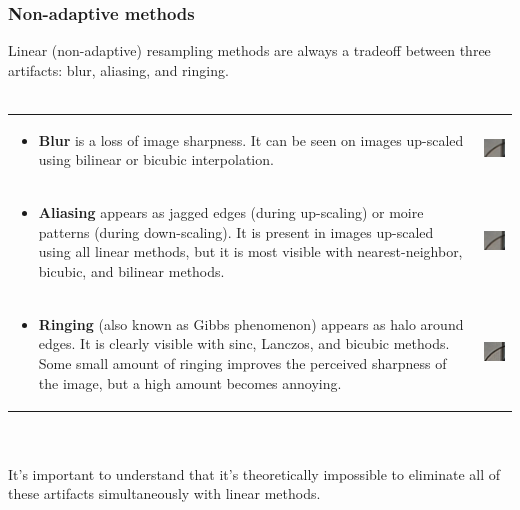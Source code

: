 \documentclass[]{usiinfbachelorproject}
\begin{document}
\subsubsection{Non-adaptive methods}

Linear (non-adaptive) resampling methods are always a tradeoff between three artifacts: blur, aliasing, and ringing.\\\\
\begin{tabular}{m{} m{}}
	\begin{itemize}
		\item {\bf Blur} is a loss of image sharpness. It can be seen on images up-scaled using bilinear or bicubic interpolation.
	\end{itemize}
	&
	\includegraphics[scale=0.75]{img/blur.jpeg}
	\\
	\begin{itemize}
		\item {\bf Aliasing} appears as jagged edges (during up-scaling) or moire patterns (during down-scaling). It is present in images up-scaled using all linear methods, but it is most visible with nearest-neighbor, bicubic, and bilinear methods.
	\end{itemize}
	&
	\includegraphics[scale=0.75]{img/aliasing.jpeg}
	\\
	\begin{itemize}
		\item {\bf Ringing} (also known as Gibbs phenomenon) appears as halo around edges. It is clearly visible with sinc, Lanczos, and bicubic methods. Some small amount of ringing improves the perceived sharpness of the image, but a high amount becomes annoying.
	\end{itemize}
	&
	\includegraphics[scale=0.75]{img/ringing.jpeg}
\end{tabular}\\\\
It's important to understand that it's theoretically impossible to eliminate all of these artifacts simultaneously with linear methods.\\
\end{document}
